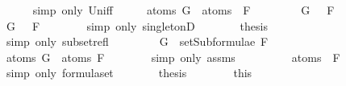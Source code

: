 \begin{isabellebody}
\ \ \ \ \isamarkupfalse%
\ {\isacharparenleft}simp\ only{\isacharcolon}\ Un{\isacharunderscore}iff{\isacharparenright}\isanewline
\ \ \isamarkupfalse%
\ \isamarkupfalse%
\ {\isachardoublequoteopen}atoms\ G\ {\isasymsubseteq}\ atoms\ {\isacharparenleft}\isactrlbold {\isasymnot}\ F{\isacharparenright}{\isachardoublequoteclose}\isanewline
\ \ \isamarkupfalse%
\isanewline
\ \ \ \ \isamarkupfalse%
\ {\isachardoublequoteopen}G\ {\isasymin}\ {\isacharbraceleft}\isactrlbold {\isasymnot}\ F{\isacharbraceright}{\isachardoublequoteclose}\isanewline
\ \ \ \ \isamarkupfalse%
\ \isamarkupfalse%
\ {\isachardoublequoteopen}G\ {\isacharequal}\ \isactrlbold {\isasymnot}\ F{\isachardoublequoteclose}\isanewline
\ \ \ \ \ \ \isamarkupfalse%
\ {\isacharparenleft}simp\ only{\isacharcolon}\ singletonD{\isacharparenright}\isanewline
\ \ \ \ \isamarkupfalse%
\ \isamarkupfalse%
\ {\isacharquery}thesis\isanewline
\ \ \ \ \ \ \isamarkupfalse%
\ {\isacharparenleft}simp\ only{\isacharcolon}\ subset{\isacharunderscore}refl{\isacharparenright}\isanewline
\ \ \isamarkupfalse%
\isanewline
\ \ \ \ \isamarkupfalse%
\ {\isachardoublequoteopen}G\ {\isasymin}\ setSubformulae\ F{\isachardoublequoteclose}\isanewline
\ \ \ \ \isamarkupfalse%
\ \isamarkupfalse%
\ {\isachardoublequoteopen}atoms\ G\ {\isasymsubseteq}\ atoms\ F{\isachardoublequoteclose}\isanewline
\ \ \ \ \ \ \isamarkupfalse%
\ {\isacharparenleft}simp\ only{\isacharcolon}\ assms{\isacharparenleft}{}{\isacharparenright}{\isacharparenright}\isanewline
\ \ \ \ \isamarkupfalse%
\ \isamarkupfalse%
\ {\isachardoublequoteopen}{\isasymdots}\ {\isacharequal}\ atoms\ {\isacharparenleft}\isactrlbold {\isasymnot}\ F{\isacharparenright}{\isachardoublequoteclose}\isanewline
\ \ \ \ \ \ \isamarkupfalse%
\ {\isacharparenleft}simp\ only{\isacharcolon}\ formula{\isachardot}set{\isacharparenleft}{}{\isacharparenright}{\isacharparenright}\isanewline
\ \ \ \ \isamarkupfalse%
\ \isamarkupfalse%
\ {\isacharquery}thesis\isanewline
\ \ \ \ \ \ \isamarkupfalse%
\ this\isanewline
\ \ \isamarkupfalse%
\isanewline
{}\isamarkupfalse%
%
\endisatagproof
{\isafoldproof}%
%
\isadelimproof
\isanewline
%
\endisadelimproof
\isanewline
{}\isamarkupfalse%

\end{isabellebody}
